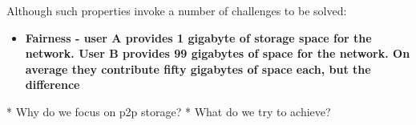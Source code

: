 Although such properties invoke a number of challenges to be solved:

\begin{itemize}
\item \bfseries{Fairness} - user \bfseries{A} provides 1 gigabyte of storage
space for the network. User \bfseries{B} provides 99 gigabytes of space
for the network. On average they contribute fifty gigabytes of space each, but
the difference 
\end{itemize}

* Why do we focus on p2p storage?
* What do we try to achieve?
